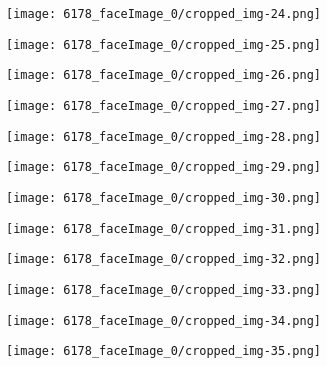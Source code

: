 \begin{figure}
{\begin{subfigure}{0.09\textwidth}
\end{subfigure}
\begin{subfigure}{0.09\textwidth}
  \centering
  \texttt{[image: 6178\_faceImage\_0/cropped\_img-24.png]}
\end{subfigure}
\begin{subfigure}{0.09\textwidth}
  \centering
  \texttt{[image: 6178\_faceImage\_0/cropped\_img-25.png]}
\end{subfigure}
\begin{subfigure}{0.09\textwidth}
  \centering
  \texttt{[image: 6178\_faceImage\_0/cropped\_img-26.png]}
\end{subfigure}
\begin{subfigure}{0.09\textwidth}
  \centering
  \texttt{[image: 6178\_faceImage\_0/cropped\_img-27.png]}
\end{subfigure}
\begin{subfigure}{0.09\textwidth}
  \centering
  \texttt{[image: 6178\_faceImage\_0/cropped\_img-28.png]}
\end{subfigure}
\begin{subfigure}{0.09\textwidth}
  \centering
  \texttt{[image: 6178\_faceImage\_0/cropped\_img-29.png]}
\end{subfigure}
}
\parbox{\textwidth}{
\begin{subfigure}{0.09\textwidth}
  \centering
  \texttt{[image: 6178\_faceImage\_0/cropped\_img-30.png]}
\end{subfigure}
\begin{subfigure}{0.09\textwidth}
  \centering
  \texttt{[image: 6178\_faceImage\_0/cropped\_img-31.png]}
\end{subfigure}
\begin{subfigure}{0.09\textwidth}
  \centering
  \texttt{[image: 6178\_faceImage\_0/cropped\_img-32.png]}
\end{subfigure}
\begin{subfigure}{0.09\textwidth}
  \centering
  \texttt{[image: 6178\_faceImage\_0/cropped\_img-33.png]}
\end{subfigure}
\begin{subfigure}{0.09\textwidth}
  \centering
  \texttt{[image: 6178\_faceImage\_0/cropped\_img-34.png]}
\end{subfigure}
\begin{subfigure}{0.09\textwidth}
  \centering
  \texttt{[image: 6178\_faceImage\_0/cropped\_img-35.png]}

\end{subfigure}}
\end{figure}
